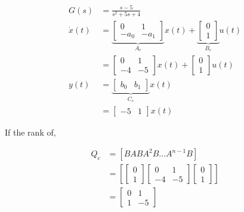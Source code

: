 \documentclass[main.tex]{subfiles}
\begin{document}
\begin{enumerate}
\begin{enumerate}
        $$
        \begin{aligned}
        G(s) &= \frac{s-5}{s^2+5s+4}\\
        \dot{x}(t) & =\underbrace{\left[\begin{array}{ccc}
        0 & 1 \\
        -a_0 & -a_1
        \end{array}\right]}_{A_c}x(t)+\underbrace{\left[\begin{array}{l}
        0 \\
        1
        \end{array}\right]}_{B_c} u(t) \\
        & =\left[\begin{array}{cc}
        0 & 1 \\
        -4 & -5
        \end{array}\right]x(t)+\left[\begin{array}{l}
        0 \\
        1
        \end{array}\right] u(t) \\
        y(t) & =\underbrace{\left[\begin{array}{ll}
        b_0 & b_1
        \end{array}\right]}_{C_c}x(t)\\
        & =\left[\begin{array}{ll}
        -5 & 1
        \end{array}\right]x(t)
        \end{aligned}
        $$
        
        If the rank of,
        
        $$
        \begin{aligned}  
        Q_c &= \left[B A B A^2 B \ldots A^{n-1} B\right]\\
        &= \left[\left[\begin{array}{l}
        0 \\
        1
        \end{array}\right] \left[\begin{array}{cc}
        0 & 1 \\
        -4 & -5
        \end{array}\right] \left[\begin{array}{l}
        0 \\
        1
        \end{array}\right] \right]\\
        & = \left[\begin{array}{cc}
        0 & 1 \\
        1 & -5
        \end{array}\right]
        \end{aligned}
        $$
        

\end{enumerate}
\end{enumerate}
\end{document}
